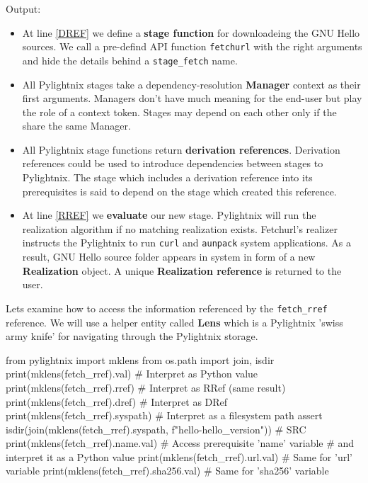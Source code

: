 \documentclass{article}
\begin{document}
Output:

\mysmallstdout

\begin{itemize}

  \item At line \ref{DREF} we define a \textbf{stage function} for
    downloadeing the GNU Hello sources. We
    call a pre-defind API function \texttt{fetchurl} with the right
    arguments and hide the details behind a \texttt{stage\_fetch} name.

  \item All Pylightnix stages take a dependency-resolution \textbf{Manager}
    context as their first arguments. Managers don't have much meaning for
    the end-user but play the role of a context token. Stages may depend on
    each other only if the share the same Manager.

  \item All Pylightnix stage functions return \textbf{derivation
    references}. Derivation references could be used to introduce
    dependencies between stages to Pylightnix. The stage which includes a
    derivation reference into its prerequisites is said to depend on the
    stage which created this reference.

  \item At line \ref{RREF} we \textbf{evaluate} our new stage. Pylightnix will
    run the realization algorithm if no matching realization exists.
    Fetchurl's realizer instructs the Pylightnix to run \texttt{curl} and
    \texttt{aunpack} system applications. As a result, GNU Hello source folder
    appears in system in form of a new \textbf{Realization} object. A unique
    \textbf{Realization reference} is returned to the user.

\end{itemize}

Lets examine how to access the information referenced by the
\texttt{fetch\_rref} reference. We will use a helper entity called
\textbf{Lens} which is a Pylightnix 'swiss army knife' for navigating through
the Pylightnix storage.

\begin{pythontexcode}
from pylightnix import mklens
from os.path import join, isdir
print(mklens(fetch_rref).val)      # Interpret as Python value
print(mklens(fetch_rref).rref)     # Interpret as RRef (same result)
print(mklens(fetch_rref).dref)     # Interpret as DRef
print(mklens(fetch_rref).syspath)  # Interpret as a filesystem path
assert isdir(join(mklens(fetch_rref).syspath,
             f"hello-{hello_version}"))  # SRC \label{SRC}
print(mklens(fetch_rref).name.val) # Access prerequisite 'name' variable
                                   # and interpret it as a Python value
print(mklens(fetch_rref).url.val)  # Same for 'url' variable
print(mklens(fetch_rref).sha256.val)  # Same for 'sha256' variable
\end{pythontexcode}
\end{document}
